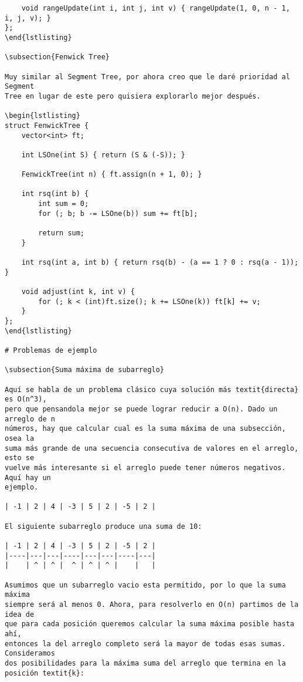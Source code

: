 \documentclass[11pt]{article}
\begin{document}
\begin{verbatim}
    void rangeUpdate(int i, int j, int v) { rangeUpdate(1, 0, n - 1, i, j, v); }
};
\end{lstlisting}

\subsection{Fenwick Tree}

Muy similar al Segment Tree, por ahora creo que le daré prioridad al Segment
Tree en lugar de este pero quisiera explorarlo mejor después.

\begin{lstlisting}
struct FenwickTree {
    vector<int> ft;

    int LSOne(int S) { return (S & (-S)); }

    FenwickTree(int n) { ft.assign(n + 1, 0); }

    int rsq(int b) {
        int sum = 0;
        for (; b; b -= LSOne(b)) sum += ft[b];

        return sum;
    }

    int rsq(int a, int b) { return rsq(b) - (a == 1 ? 0 : rsq(a - 1)); }

    void adjust(int k, int v) {
        for (; k < (int)ft.size(); k += LSOne(k)) ft[k] += v;
    }
};
\end{lstlisting}

# Problemas de ejemplo

\subsection{Suma máxima de subarreglo}

Aquí se habla de un problema clásico cuya solución más textit{directa} es O(n^3),
pero que pensandola mejor se puede lograr reducir a O(n). Dado un arreglo de n
números, hay que calcular cual es la suma máxima de una subsección, osea la
suma más grande de una secuencia consecutiva de valores en el arreglo, esto se
vuelve más interesante si el arreglo puede tener números negativos. Aquí hay un
ejemplo.

| -1 | 2 | 4 | -3 | 5 | 2 | -5 | 2 |

El siguiente subarreglo produce una suma de 10:

| -1 | 2 | 4 | -3 | 5 | 2 | -5 | 2 |
|----|---|---|----|---|---|----|---|
|    | ^ | ^ |  ^ | ^ | ^ |    |   |

Asumimos que un subarreglo vacio esta permitido, por lo que la suma máxima
siempre será al menos 0. Ahora, para resolverlo en O(n) partimos de la idea de
que para cada posición queremos calcular la suma máxima posible hasta ahí,
entonces la del arreglo completo será la mayor de todas esas sumas. Consideramos
dos posibilidades para la máxima suma del arreglo que termina en la posición textit{k}:


\end{verbatim}
\end{document}
